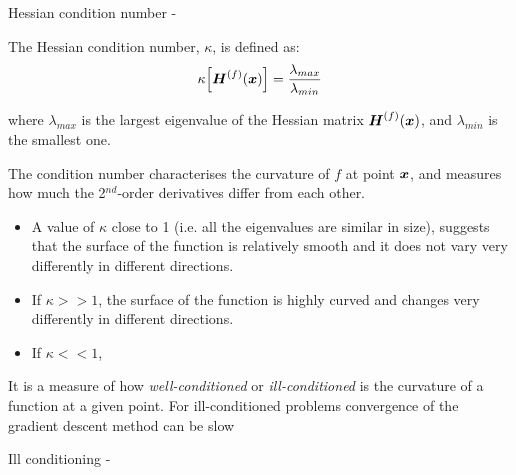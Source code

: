 \begin{frame}[t,allowframebreaks]{Hessian condition number -}

    The \gls{Hessian condition number}, 
    $\kappa$, is defined as:
    \begin{equation}
        \kappa \Bigl[ \boldsymbol{H}^{(f)}(\boldsymbol{x}) \Bigr] 
          = \frac{\lambda_{max}}{\lambda_{min}}
        \label{eq:hessian_condition_number_1}
    \end{equation}

    where $\lambda_{max}$ is the largest 
    \gls{eigenvalue} 
    of the \gls{Hessian matrix} 
    $\boldsymbol{H}^{(f)}(\boldsymbol{x})$, and  $\lambda_{min}$ 
    is the smallest one.\\
    
    \vspace{0.2cm}

    The \gls{condition number} characterises 
    the curvature of $f$ at point $\boldsymbol{x}$, and measures
    how much the 2$^{nd}$-order derivatives differ from each other.

    \begin{itemize}
        \item
        A value of $\kappa$ close to 1 (i.e. all the \glspl{eigenvalue} are similar in size), 
        suggests that the surface of the function 
        is relatively smooth and it does not vary very differently in different directions.
        \item
        If $\kappa >> 1$, the surface of the function is highly curved
        and changes very differently in different directions.
        \item
        If $\kappa << 1$,
    \end{itemize}

    It is a measure of how {\em well-conditioned} or 
    {\em ill-conditioned} is the curvature of a function at a given point.
    For ill-conditioned problems convergence of the 
    \gls{gradient descent} method can be slow\\


\end{frame}

\begin{frame}[t,allowframebreaks]{Ill conditioning -}

\end{frame}

